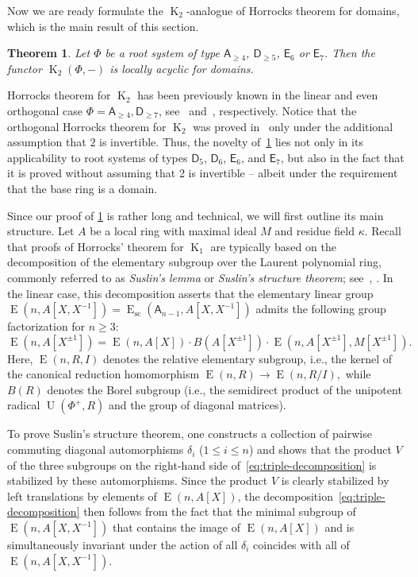 \documentclass[oneside, 10pt]{amsart}
\DeclareMathOperator{\E}{E}
\DeclareMathOperator{\UU}{U}
\newcommand{\Esc}{\E_\mathrm{sc}}
\DeclareMathOperator{\K}{K}
\newcommand{\rA}{\mathsf{A}}
\newcommand{\rD}{\mathsf{D}}
\newcommand{\rE}{\mathsf{E}}
\newcommand{\inv}{^{-1}}
\newtheorem{thm}{Theorem}
\numberwithin{equation}{section}
\numberwithin{thm}{section}
\numberwithin{lemma}{section}
\theoremstyle{definition}
\theoremstyle{remark}
\begin{document}
Now we are ready formulate the $\K_2$-analogue of Horrocks theorem for domains,
which is the main result of this section.
\begin{thm}\label{thm:horrocks-k2}
Let $\Phi$ be a root system of type $\rA_{\geq 4}$, $\rD_{\geq 5}$, $\rE_6$ or $\rE_7$.
Then the functor $\K_{2}(\Phi, -)$ is locally acyclic for domains.
\end{thm}
Horrocks theorem for $\K_2$ has been previously known in the linear and even orthogonal case $\Phi=\rA_{\geq 4},\rD_{\geq 7}$, see~\cite[Proposition~4.3]{Tu83} and~\cite[Theorem~1]{LS20}, respectively.
Notice that the orthogonal Horrocks theorem for $\K_2$ was proved in~\cite{LS20} only under the additional assumption that $2$ is invertible.
Thus, the novelty of~\cref{thm:horrocks-k2} lies not only in its applicability to root systems of types $\rD_5$, $\rD_6$, $\rE_6$, and $\rE_7$, but also in the fact that
it is proved without assuming that 2 is invertible -- albeit under the requirement that the base ring is a domain.

Since our proof of \cref{thm:horrocks-k2} is rather long and technical, we will first outline its main structure.
Let \( A \) be a local ring with maximal ideal \( M \) and residue field \( \kappa \).
Recall that proofs of Horrocks' theorem for \( \K_1 \) are typically based on the decomposition of the elementary subgroup over the Laurent polynomial ring,
commonly referred to as \textit{Suslin's lemma} or \textit{Suslin's structure theorem}; see~\cite{Abe83, Su77}, \cite[\S~VI.6]{Lam10}.
In the linear case, this decomposition asserts that the elementary linear group
\( \E(n, A[X, X\inv]) = \Esc(\rA_{n-1}, A[X, X\inv]) \) admits the following group factorization for \( n \geq 3 \):
\begin{equation}\label{eq:triple-decomposition}
\E(n, A[X^{\pm 1}]) = \E(n, A[X]) \cdot B(A[X^{\pm 1}]) \cdot \E(n, A[X^{\pm 1}], M[X^{\pm 1}]).
\end{equation}
Here, \( \E(n, R, I) \) denotes the relative elementary subgroup, i.e., the kernel of the canonical reduction homomorphism \( \E(n, R) \to \E(n, R/I), \)
while \( B(R) \) denotes the Borel subgroup (i.e., the semidirect product of the unipotent radical \( \UU(\Phi^+, R) \) and the group of diagonal matrices).

To prove Suslin's structure theorem, one constructs a collection of pairwise commuting diagonal automorphisms \( \delta_i \) (\( 1 \leq i \leq n \))
and shows that the product \( V \) of the three subgroups on the right-hand side of~\eqref{eq:triple-decomposition} is stabilized by these automorphisms.
Since the product \( V \) is clearly stabilized by left translations by elements of \( \E(n, A[X]) \),
the decomposition~\eqref{eq:triple-decomposition} then follows from the fact that the minimal subgroup of \( \E(n, A[X, X\inv]) \)
that contains the image of \( \E(n, A[X]) \) and is simultaneously invariant under the action of all \( \delta_i \)
coincides with all of \( \E(n, A[X, X\inv]) \).
\end{document}
